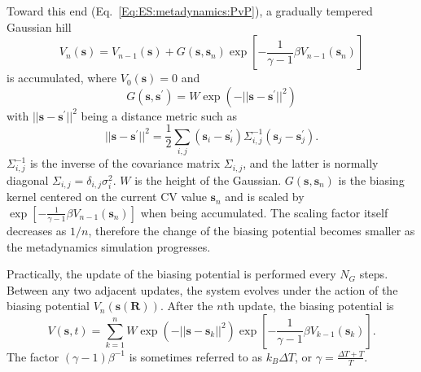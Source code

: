Toward this end (Eq.~\ref{Eq:ES:metadynamics:PvP}), a gradually tempered Gaussian hill
\begin{equation}
    V_n(\mathbf{s})=V_{n-1}(\mathbf{s})+G(\mathbf{s},\mathbf{s}_n)\exp{\left[-\frac{1}{\gamma-1}\beta V_{n-1}(\mathbf{s}_n)\right]}
\end{equation}
is accumulated, where $V_0(\mathbf{s})=0$ and
\begin{equation}
    G(\mathbf{s},\mathbf{s}^\prime)=W\exp{\left(-||\mathbf{s}-\mathbf{s}^\prime||^2\right)}
\end{equation}
with $||\mathbf{s}-\mathbf{s}^\prime||^2$ being a distance metric such as
\begin{equation}
    ||\mathbf{s}-\mathbf{s}^\prime||^2=\frac{1}{2}\sum_{i,j}{(\mathbf{s}_i-\mathbf{s}_i^\prime)\Sigma_{i,j}^{-1}(\mathbf{s}_j-\mathbf{s}_j^\prime)}.
\end{equation}
$\Sigma_{i,j}^{-1}$ is the inverse of the covariance matrix $\Sigma_{i,j}$, and the latter is normally diagonal $\Sigma_{i,j}=\delta_{i,j}\sigma_i^2$. $W$ is the height of the Gaussian. $G(\mathbf{s},\mathbf{s}_n)$ is the biasing kernel centered on the current CV value $\mathbf{s}_n$ and is scaled by $\exp{\left[-\frac{1}{\gamma-1}\beta V_{n-1}(\mathbf{s}_n)\right]}$ when being accumulated. The scaling factor itself decreases as $1/n$, therefore the change of the biasing potential becomes smaller as the metadynamics simulation progresses.\cite{BarducciPRL2008,DamaPRL2014}

Practically, the update of the biasing potential is performed every $N_G$ steps. Between any two adjacent updates, the system evolves under the action of the biasing potential $V_n(\mathbf{s}(\mathbf{R}))$. After the $n$th update, the biasing potential is
\begin{equation}
    V(\mathbf{s},t)=\sum_{k=1}^n W\exp{\left(-||\mathbf{s}-\mathbf{s}_k||^2\right)}\exp{\left[-\frac{1}{\gamma-1}\beta V_{k-1}(\mathbf{s}_k)\right]}.
\end{equation}
The factor $(\gamma-1)\beta^{-1}$ is sometimes referred to as $k_B\Delta T$, or $\gamma=\frac{\Delta T+T}{T}$.

